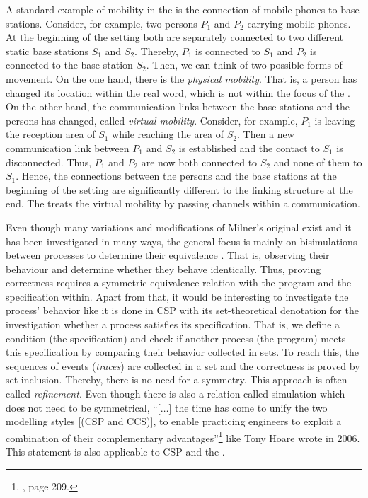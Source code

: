 A standard example of mobility in the \picalc{} is the connection of mobile phones to base stations. Consider, for example, two persons $P_1$ and $P_2$ carrying mobile phones. At the beginning of the setting both are separately connected to two different static base stations $S_1$ and $S_2$. Thereby, $P_1$ is connected to $S_1$ and $P_2$ is connected to the base station $S_2$. Then, we can think of two possible forms of movement. On the one hand, there is the \emph{physical mobility}. That is, a person has changed its location within the real word, which is not within the focus of the \picalc{}. On the other hand, the communication links between the base stations and the persons has changed, called \emph{virtual mobility}. Consider, for example, $P_1$ is leaving the reception area of $S_1$ while reaching the area of $S_2$. Then a new communication link between $P_1$ and $S_2$ is established and the contact to $S_1$ is disconnected. Thus, $P_1$ and $P_2$ are now both connected to $S_2$ and none of them to $S_1$. Hence, the connections between the persons and the base stations at the beginning of the setting are significantly different to the linking structure at the end. The \picalc{} treats the virtual mobility by passing channels within a communication.

Even though many variations and modifications of Milner's original \picalc{} exist and it has been investigated in many ways, the general focus is mainly on bisimulations between processes to determine their equivalence \cite{pistore}. That is, observing their behaviour and determine whether they behave identically. Thus, proving correctness requires a symmetric equivalence relation with the program and the specification within. Apart from that, it would be interesting to investigate the process' behavior like it is done in \gls{CSP} with its set-theoretical denotation for the investigation whether a process satisfies its specification. That is, we define a condition (the specification) and check if another process (the program) meets this specification by comparing their behavior collected in sets. To reach this, the sequences of events (\emph{traces}) are collected in a set and the correctness is proved by set inclusion. Thereby, there is no need for a symmetry. This approach is often called \emph{refinement}. Even though there is also a relation called simulation which does not need to be symmetrical, ``[$\ldots$] the time has come to unify the two modelling styles [(\gls{CSP} and \gls{CCS})], to enable practicing engineers to exploit a combination of their complementary advantages''\footnote{\cite{hoareWhyCSP}, page 209.} like Tony Hoare wrote in 2006. This statement is also applicable to \gls{CSP} and the \picalc{}.


